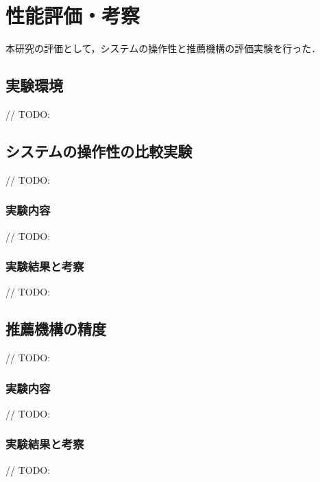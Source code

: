 \chapter{性能評価・考察}
本研究の評価として，システムの操作性と推薦機構の評価実験を行った．

\section{実験環境}
// TODO:

\section{システムの操作性の比較実験}
// TODO:

\subsection{実験内容}
// TODO:

\subsection{実験結果と考察}
// TODO:

\section{推薦機構の精度}
// TODO:

\subsection{実験内容}
// TODO:

\subsection{実験結果と考察}
// TODO:
